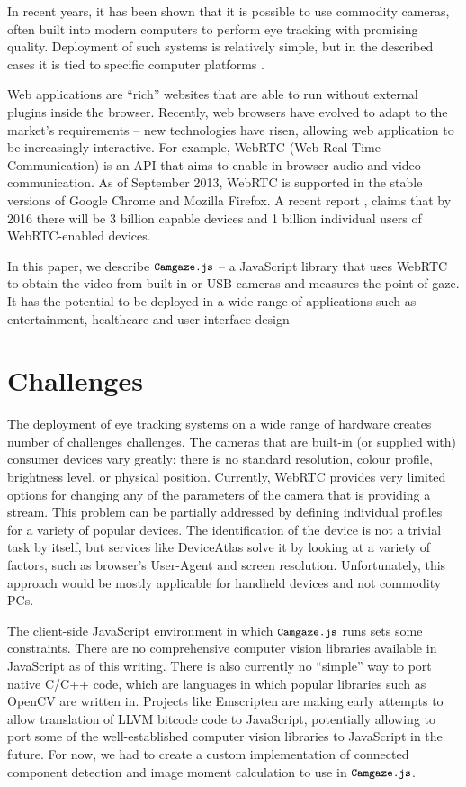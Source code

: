 \documentclass[annual]{acmsiggraph}
\newcommand{\Acronym}[1]{\ensuremath{{\small{\texttt{#1}}}}}
\newcommand{\Name}{\Acronym{Camgaze.js}} \newcommand{\False}{\Constant{false}}
\newcommand{\Constant}[1]{\ensuremath{\small{\texttt{#1}}}}
\begin{document}
In recent years, it has been shown \cite{SanAgustin2009}\cite{Sewell2010}
that it is possible to use commodity cameras, often built into modern
computers to perform eye tracking with promising quality. Deployment of such
systems is relatively simple, but in the described cases it is tied to specific
computer platforms \cite{holland2012eye}.

Web applications are “rich” websites that are able to run without external
plugins inside the browser. Recently, web browsers have evolved to adapt to
the market’s requirements -- new technologies have risen, allowing web
application to be increasingly interactive. For example, WebRTC (Web Real-Time
Communication) is an API that aims to enable in-browser audio and video
communication. As of September 2013, WebRTC is supported in the stable versions
of Google Chrome and Mozilla Firefox. A recent report
\cite{DisruptiveAnalysis2013}, claims that by 2016 there will be
3 billion capable devices and 1 billion individual users of WebRTC-enabled
devices.

In this paper, we describe $\Name$ -- a JavaScript library that uses WebRTC to
obtain the video from built-in or USB cameras and measures the point of gaze.
It has the potential to be deployed in a wide range of applications such as
entertainment, healthcare and user-interface design



\section{Challenges}

The deployment of eye tracking systems on a wide range of hardware creates
number of challenges challenges.  The cameras that are built-in (or supplied
with) consumer devices vary greatly: there is no standard resolution, colour
profile, brightness level, or physical position. Currently, WebRTC provides
very limited options for changing any of the parameters of the camera that is
providing a stream. This problem can be partially addressed by defining
individual profiles for a variety of popular devices. The identification of the
device is not a trivial task by itself, but services like DeviceAtlas
\cite{DeviceAtlas2013} solve it by looking at a variety of factors, such as
browser’s User-Agent and screen resolution.  Unfortunately, this approach would
be mostly applicable for handheld devices and not commodity PCs.

The client-side JavaScript environment in which $\Name$ runs sets some
constraints. There are no comprehensive computer vision libraries available in
JavaScript as of this writing.  There is also currently no “simple” way to port
native C/C++ code, which are languages in which popular libraries such as
OpenCV are written in.  Projects like Emscripten are making early attempts to
allow translation of LLVM bitcode code to JavaScript, potentially allowing to
port some of the well-established computer vision libraries to JavaScript in
the future. For now, we had to create a custom implementation of connected
component detection and image moment calculation to use in $\Name$.
\end{document}
